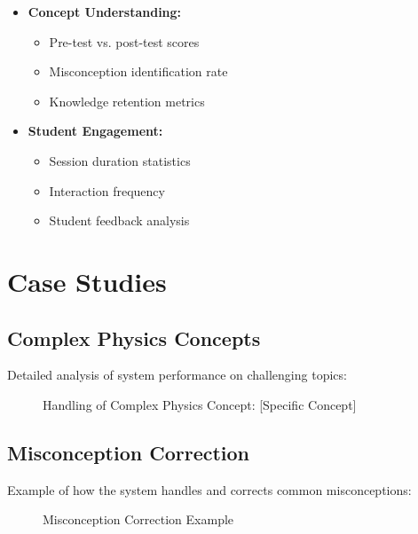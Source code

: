\begin{itemize}
    \item \textbf{Concept Understanding:}
        \begin{itemize}
            \item Pre-test vs. post-test scores
            \item Misconception identification rate
            \item Knowledge retention metrics
        \end{itemize}
    
    \item \textbf{Student Engagement:}
        \begin{itemize}
            \item Session duration statistics
            \item Interaction frequency
            \item Student feedback analysis
        \end{itemize}
\end{itemize}

\section{Case Studies}
\label{sec:case-studies}

\subsection{Complex Physics Concepts}
Detailed analysis of system performance on challenging topics:

\begin{figure}[h]
    \centering
    \caption{Handling of Complex Physics Concept: [Specific Concept]}
    \label{fig:complex-concept}
\end{figure}

\subsection{Misconception Correction}
Example of how the system handles and corrects common misconceptions:

\begin{figure}[h]
    \centering
    \caption{Misconception Correction Example}
    \label{fig:misconception-correction}
\end{figure}

